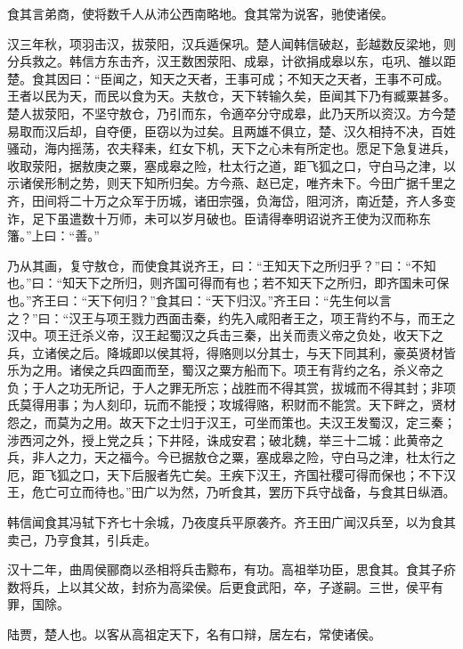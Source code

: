 \documentclass[12pt,UTF8]{ctexbook}
\begin{document}
食其言弟商，使将数千人从沛公西南略地。食其常为说客，驰使诸侯。



汉三年秋，项羽击汉，拔荥阳，汉兵遁保巩。楚人闻韩信破赵，彭越数反梁地，则分兵救之。韩信方东击齐，汉王数困荥阳、成皋，计欲捐成皋以东，屯巩、雒以距楚。食其因曰：“臣闻之，知天之天者，王事可成；不知天之天者，王事不可成。王者以民为天，而民以食为天。夫敖仓，天下转输久矣，臣闻其下乃有臧粟甚多。楚人拔荥阳，不坚守敖仓，乃引而东，令適卒分守成皋，此乃天所以资汉。方今楚易取而汉后却，自夺便，臣窃以为过矣。且两雄不俱立，楚、汉久相持不决，百姓骚动，海内摇荡，农夫释耒，红女下机，天下之心未有所定也。愿足下急复进兵，收取荥阳，据敖庚之粟，塞成皋之险，杜太行之道，距飞狐之口，守白马之津，以示诸侯形制之势，则天下知所归矣。方今燕、赵已定，唯齐未下。今田广据千里之齐，田间将二十万之众军于历城，诸田宗强，负海岱，阻河济，南近楚，齐人多变诈，足下虽遣数十万师，未可以岁月破也。臣请得奉明诏说齐王使为汉而称东籓。”上曰：“善。”



乃从其画，复守敖仓，而使食其说齐王，曰：“王知天下之所归乎？”曰：“不知也。”曰：“知天下之所归，则齐国可得而有也；若不知天下之所归，即齐国未可保也。”齐王曰：“天下何归？”食其曰：“天下归汉。”齐王曰：“先生何以言之？”曰：“汉王与项王戮力西面击秦，约先入咸阳者王之，项王背约不与，而王之汉中。项王迁杀义帝，汉王起蜀汉之兵击三秦，出关而责义帝之负处，收天下之兵，立诸侯之后。降城即以侯其将，得赂则以分其士，与天下同其利，豪英贤材皆乐为之用。诸侯之兵四面而至，蜀汉之粟方船而下。项王有背约之名，杀义帝之负；于人之功无所记，于人之罪无所忘；战胜而不得其赏，拔城而不得其封；非项氏莫得用事；为人刻印，玩而不能授；攻城得赂，积财而不能赏。天下畔之，贤材怨之，而莫为之用。故天下之士归于汉王，可坐而策也。夫汉王发蜀汉，定三秦；涉西河之外，授上党之兵；下井陉，诛成安君；破北魏，举三十二城：此黄帝之兵，非人之力，天之福今。今已据敖仓之粟，塞成皋之险，守白马之津，杜太行之厄，距飞狐之口，天下后服者先亡矣。王疾下汉王，齐国社稷可得而保也；不下汉王，危亡可立而待也。”田广以为然，乃听食其，罢历下兵守战备，与食其日纵酒。



韩信闻食其冯轼下齐七十余城，乃夜度兵平原袭齐。齐王田广闻汉兵至，以为食其卖己，乃亨食其，引兵走。



汉十二年，曲周侯郦商以丞相将兵击黥布，有功。高祖举功臣，思食其。食其子疥数将兵，上以其父故，封疥为高梁侯。后更食武阳，卒，子遂嗣。三世，侯平有罪，国除。



陆贾，楚人也。以客从高祖定天下，名有口辩，居左右，常使诸侯。
\end{document}
